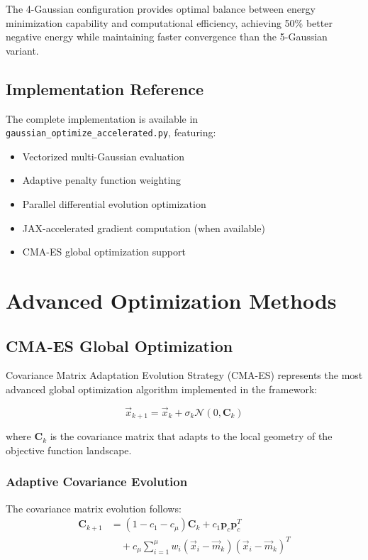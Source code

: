 \documentclass[12pt,a4paper]{article}
\begin{document}
The 4-Gaussian configuration provides optimal balance between energy minimization capability and computational efficiency, achieving 50\% better negative energy while maintaining faster convergence than the 5-Gaussian variant.

\subsection{Implementation Reference}

The complete implementation is available in \texttt{gaussian\_optimize\_accelerated.py}, featuring:
\begin{itemize}
\item Vectorized multi-Gaussian evaluation
\item Adaptive penalty function weighting
\item Parallel differential evolution optimization
\item JAX-accelerated gradient computation (when available)
\item CMA-ES global optimization support
\end{itemize}

\section{Advanced Optimization Methods}
\label{sec:advanced_optimization}

\subsection{CMA-ES Global Optimization}

Covariance Matrix Adaptation Evolution Strategy (CMA-ES) represents the most advanced global optimization algorithm implemented in the framework:

\begin{equation}
\vec{x}_{k+1} = \vec{x}_k + \sigma_k \mathcal{N}(0, \mathbf{C}_k)
\end{equation}

where $\mathbf{C}_k$ is the covariance matrix that adapts to the local geometry of the objective function landscape.

\subsubsection{Adaptive Covariance Evolution}

The covariance matrix evolution follows:
\begin{align}
\mathbf{C}_{k+1} &= (1-c_1-c_{\mu})\mathbf{C}_k + c_1 \mathbf{p}_c \mathbf{p}_c^T \\
&\quad + c_{\mu} \sum_{i=1}^{\mu} w_i (\vec{x}_i - \vec{m}_k)(\vec{x}_i - \vec{m}_k)^T
\end{align}
\end{document}
